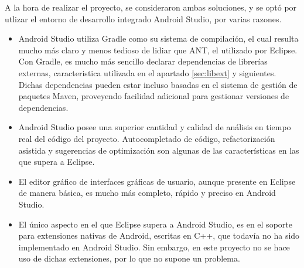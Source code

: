A la hora de realizar el proyecto, se consideraron ambas soluciones, y se optó por utlizar el entorno de desarrollo integrado Android Studio, por varias razones.
\begin{itemize}

\item Android Studio utiliza Gradle como su sistema de compilación, el cual resulta mucho más claro y menos tedioso de lidiar que ANT, el utilizado por Eclipse. Con Gradle, es mucho más sencillo declarar dependencias de librerías externas, caracteristica utilizada en el apartado \ref{sec:libext} y siguientes. Dichas dependencias pueden estar incluso basadas en el sistema de gestión de paquetes Maven, proveyendo facilidad adicional para gestionar versiones de dependencias.

\item Android Studio posee una superior cantidad y calidad de análisis en tiempo real del código del proyecto. Autocompletado de código, refactorización asistida y sugerencias de optimización son algunas de las características en las que supera a Eclipse.

\item El editor gráfico de interfaces gráficas de usuario, aunque presente en Eclipse de manera básica, es mucho más completo, rápido y preciso en Android Studio.

\item El único aspecto en el que Eclipse supera a Android Studio, es en el soporte para extensiones nativas de Android, escritas en C++, que todavía no ha sido implementado en Android Studio. Sin embargo, en este proyecto no se hace uso de dichas extensiones, por lo que no supone un problema.

\end{itemize}
